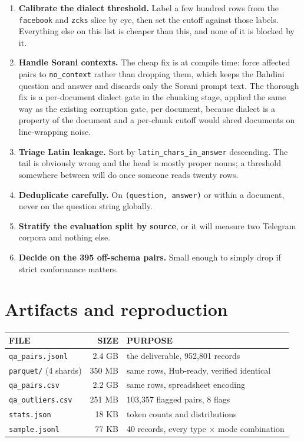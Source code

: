 \documentclass[10pt,a4paper]{article}
\newcommand{\kw}[1]{\textbf{#1}}
\newcommand{\codeid}[1]{\texttt{\footnotesize\color{inksoft}#1}}
\newcommand{\tablehead}[1]{{\uimed\fontsize{6.8}{8}\selectfont\color{crail}\mbox{#1}}}
\begin{document}
\begin{enumerate}
\item \kw{Calibrate the dialect threshold.} Label a few hundred rows from the
\codeid{facebook} and \codeid{zcks} slice by eye, then set the cutoff against
those labels. Everything else on this list is cheaper than this, and none of it
is blocked by it.

\item \kw{Handle Sorani contexts.} The cheap fix is at compile time: force
affected pairs to \codeid{no\_context} rather than dropping them, which keeps
the Bahdini question and answer and discards only the Sorani prompt text. The
thorough fix is a per-document dialect gate in the chunking stage, applied the
same way as the existing corruption gate, per document, because dialect is a
property of the document and a per-chunk cutoff would shred documents on
line-wrapping noise.

\item \kw{Triage Latin leakage.} Sort by \codeid{latin\_chars\_in\_answer}
descending. The tail is obviously wrong and the head is mostly proper nouns; a
threshold somewhere between will do once someone reads twenty rows.

\item \kw{Deduplicate carefully.} On \codeid{(question, answer)} or within a
document, never on the question string globally.

\item \kw{Stratify the evaluation split by source}, or it will measure two
Telegram corpora and nothing else.

\item \kw{Decide on the 395 off-schema pairs.} Small enough to simply drop if
strict conformance matters.
\end{enumerate}

\section{Artifacts and reproduction}

\begin{tabularx}{\textwidth}{@{}p{4.9cm}rL@{}}
\tablehead{FILE} & \tablehead{SIZE} & \tablehead{PURPOSE}\\
\midrule
\codeid{qa\_pairs.jsonl} & 2.4 GB & the deliverable, 952,801 records\\
\codeid{parquet/} (4 shards) & 350 MB & same rows, Hub-ready, verified identical\\
\codeid{qa\_pairs.csv} & 2.2 GB & same rows, spreadsheet encoding\\
\codeid{qa\_outliers.csv} & 251 MB & 103,357 flagged pairs, 8 flags\\
\codeid{stats.json} & 18 KB & token counts and distributions\\
\codeid{sample.jsonl} & 77 KB & 40 records, every type $\times$ mode combination\\
\bottomrule
\end{tabularx}
\end{document}
